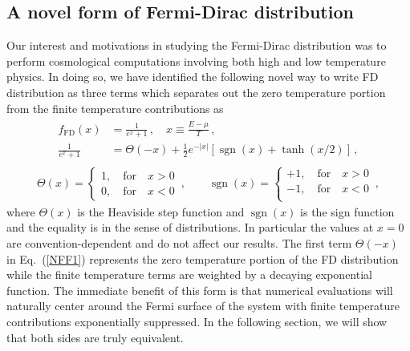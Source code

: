 \documentclass[sn-mathphys,Numbered]{sn-jnl}
\newcommand{\req}[1]{Eq.~(\ref{#1})}
\DeclareMathOperator{\sgn}{sgn}
\begin{document}
\subsection{A novel form of Fermi-Dirac distribution}
\label{Novel}
Our interest and motivations in studying the Fermi-Dirac distribution was to perform cosmological computations involving both high and low temperature physics. In doing so, we have identified the following novel way to write FD distribution as three terms which separates out the zero temperature portion from the finite temperature contributions as 
\begin{align}
\label{NFF1}
\begin{split}
f_\mathrm{FD}(x)
&=\frac{1}{e^{x}+1}\,,\quad
x\equiv\frac{E-\mu}{T}\,,\\
\frac{1}{e^{x} +1}&=\Theta(-x)+\frac{1}{2}e^{-|x|}\left[\sgn(x)+\tanh(x/2)\right]
\,,
\end{split}
\end{align}
\begin{align}
\label{NFF2}
\Theta(x)=\left\{
\begin{array}{r}
1,\quad\mathrm{for}\quad{x}>0\\
0,\quad\mathrm{for}\quad{x}<0
\end{array}\right.\,,\qquad
\sgn(x)=\left\{
\begin{array}{r}
+1,\quad\mathrm{for}\quad{x}>0\\
-1,\quad\mathrm{for}\quad{x}<0\\
\end{array}\right.\,,
\end{align}
where $\Theta(x)$ is the Heaviside step function and $\sgn(x)$ is the sign function and the equality is in the sense of distributions. In particular the values at $x=0$ are convention-dependent and do not affect our results. The first term $\Theta(-x)$ in \req{NFF1} represents the zero temperature portion of the FD distribution while the finite temperature terms are weighted by a decaying exponential function. The immediate benefit of this form is that numerical evaluations will naturally center around the Fermi surface of the system with finite temperature contributions exponentially suppressed. In the following section, we will show that both sides are truly equivalent.

\end{document}
